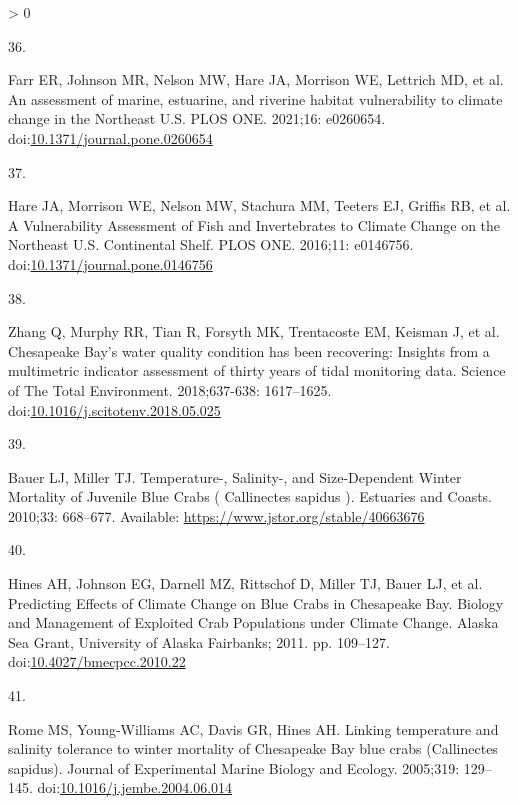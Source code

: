\documentclass[
  10pt,
]{article}
\newlength{\cslhangindent}
\newlength{\csllabelwidth}
\newenvironment{CSLReferences}[2] %
 {%
  \setlength{\parindent}{0pt}
  \ifodd #1 \everypar{\setlength{\hangindent}{\cslhangindent}}\ignorespaces\fi
  \ifnum #2 > 0
  \setlength{\parskip}{#2\baselineskip}
  \fi
 }%
 {}
\newcommand{\CSLLeftMargin}[1]{\parbox[t]{\csllabelwidth}{#1}}
\newcommand{\CSLRightInline}[1]{\parbox[t]{\linewidth - \csllabelwidth}{#1}\break}
\begin{document}
\begin{CSLReferences}{0}{0}
\leavevmode\hypertarget{ref-farr_assessment_2021}{}%
\CSLLeftMargin{36. }
\CSLRightInline{Farr ER, Johnson MR, Nelson MW, Hare JA, Morrison WE,
Lettrich MD, et al. An assessment of marine, estuarine, and riverine
habitat vulnerability to climate change in the {Northeast} {U}.{S}. PLOS
ONE. 2021;16: e0260654.
doi:\href{https://doi.org/10.1371/journal.pone.0260654}{10.1371/journal.pone.0260654}}

\leavevmode\hypertarget{ref-hare_vulnerability_2016}{}%
\CSLLeftMargin{37. }
\CSLRightInline{Hare JA, Morrison WE, Nelson MW, Stachura MM, Teeters
EJ, Griffis RB, et al. A {Vulnerability} {Assessment} of {Fish} and
{Invertebrates} to {Climate} {Change} on the {Northeast} {U}.{S}.
{Continental} {Shelf}. PLOS ONE. 2016;11: e0146756.
doi:\href{https://doi.org/10.1371/journal.pone.0146756}{10.1371/journal.pone.0146756}}

\leavevmode\hypertarget{ref-zhang_chesapeake_2018}{}%
\CSLLeftMargin{38. }
\CSLRightInline{Zhang Q, Murphy RR, Tian R, Forsyth MK, Trentacoste EM,
Keisman J, et al. Chesapeake {Bay}'s water quality condition has been
recovering: {Insights} from a multimetric indicator assessment of thirty
years of tidal monitoring data. Science of The Total Environment.
2018;637-638: 1617--1625.
doi:\href{https://doi.org/10.1016/j.scitotenv.2018.05.025}{10.1016/j.scitotenv.2018.05.025}}

\leavevmode\hypertarget{ref-bauer_temperature-_2010}{}%
\CSLLeftMargin{39. }
\CSLRightInline{Bauer LJ, Miller TJ. Temperature-, {Salinity}-, and
{Size}-{Dependent} {Winter} {Mortality} of {Juvenile} {Blue} {Crabs} (
{Callinectes} sapidus ). Estuaries and Coasts. 2010;33: 668--677.
Available: \url{https://www.jstor.org/stable/40663676}}

\leavevmode\hypertarget{ref-hines_predicting_2011}{}%
\CSLLeftMargin{40. }
\CSLRightInline{Hines AH, Johnson EG, Darnell MZ, Rittschof D, Miller
TJ, Bauer LJ, et al. Predicting {Effects} of {Climate} {Change} on
{Blue} {Crabs} in {Chesapeake} {Bay}. Biology and {Management} of
{Exploited} {Crab} {Populations} under {Climate} {Change}. Alaska Sea
Grant, University of Alaska Fairbanks; 2011. pp. 109--127.
doi:\href{https://doi.org/10.4027/bmecpcc.2010.22}{10.4027/bmecpcc.2010.22}}

\leavevmode\hypertarget{ref-rome_linking_2005}{}%
\CSLLeftMargin{41. }
\CSLRightInline{Rome MS, Young-Williams AC, Davis GR, Hines AH. Linking
temperature and salinity tolerance to winter mortality of {Chesapeake}
{Bay} blue crabs ({Callinectes} sapidus). Journal of Experimental Marine
Biology and Ecology. 2005;319: 129--145.
doi:\href{https://doi.org/10.1016/j.jembe.2004.06.014}{10.1016/j.jembe.2004.06.014}}


\end{CSLReferences}
\end{document}
